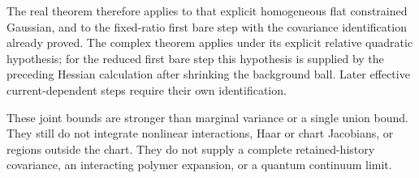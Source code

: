 The real theorem therefore applies to that explicit homogeneous
flat constrained Gaussian, and to the fixed-ratio first bare
step with the covariance identification already proved. The
complex theorem applies under its explicit relative quadratic
hypothesis; for the reduced first bare step this hypothesis is
supplied by the preceding Hessian calculation after shrinking
the background ball. Later effective current-dependent steps
require their own identification.

These joint bounds are stronger than marginal variance or a
single union bound. They still do not integrate nonlinear
interactions, Haar or chart Jacobians, or regions outside the
chart. They do not supply a complete retained-history covariance,
an interacting polymer expansion, or a quantum continuum limit.
